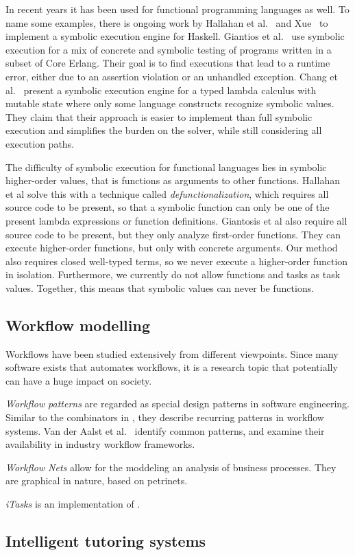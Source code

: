 In recent years it has been used for functional programming languages as well.
To name some examples, there is ongoing work by Hallahan et al.~\cite{HallahanXP2017} and Xue~\cite{Xue2019} to implement a symbolic execution engine for Haskell.
Giantios et al.~\cite{GiantsiosPS2017} use symbolic execution for a mix of concrete and symbolic testing of programs written in a subset of Core Erlang.
Their goal is to find executions that lead to a runtime error, either due to an assertion violation or an unhandled exception.
Chang et al.~\cite{ChangKT2018} present a symbolic execution engine for a typed lambda calculus with mutable state where only some language constructs recognize symbolic values.
They claim that their approach is easier to implement than full symbolic execution and simplifies the burden on the solver, while still considering all execution paths.

The difficulty of symbolic execution for functional languages lies in symbolic higher-order values, that is functions as arguments to other functions.
Hallahan et al solve this with a technique called \emph{defunctionalization}, which requires all source code to be present, so that a symbolic function can only be one of the present lambda expressions or function definitions.
Giantosis et al also require all source code to be present, but they only analyze first-order functions.
They can execute higher-order functions, but only with concrete arguments.
Our method also requires closed well-typed terms, so we never execute a higher-order function in isolation.
Furthermore, we currently do not allow functions and tasks as task values.
Together, this means that symbolic values can never be functions.

\subsection{Workflow modelling}

Workflows have been studied extensively from different viewpoints.
Since many software exists that automates workflows, it is a research topic that potentially can have a huge impact on society.

\emph{Workflow patterns} are regarded as special design patterns in software engineering.
Similar to the combinators in \TOP, they describe recurring patterns in workflow systems.
Van der Aalst et al.~\cite{journals/dpd/AalstHKB03} identify common patterns, and examine their availability in industry workflow frameworks.

\emph{Workflow Nets} allow for the moddeling an analysis of business processes.
They are graphical in nature, based on petrinets.

\emph{iTasks} is an implementation of \TOP.



\subsection{Intelligent tutoring systems}
